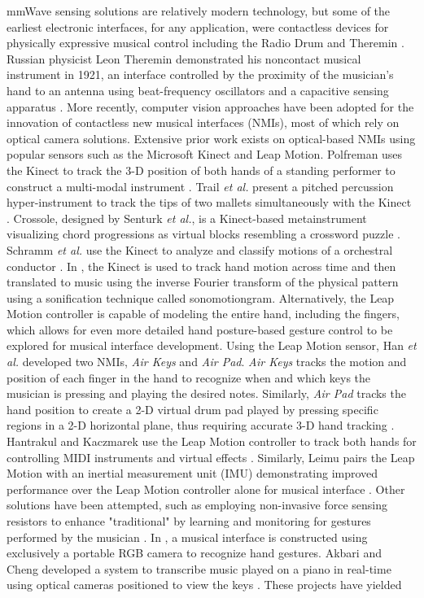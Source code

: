 \documentclass[10pt,journal,final]{IEEEtran}
\begin{document}
mmWave sensing solutions are relatively modern technology, but some of the earliest electronic interfaces, for any application, were contactless devices for physically expressive musical control including the Radio Drum and Theremin \cite{intro:theremin_and_radio_drum}. Russian physicist Leon Theremin demonstrated his noncontact musical instrument in 1921, an interface controlled by the proximity of the musician's hand to an antenna using beat-frequency oscillators and a capacitive sensing apparatus \cite{intro:phyics_of_the_theremin}. More recently, computer vision approaches have been adopted for the innovation of contactless new musical interfaces (NMIs), most of which rely on optical camera solutions. Extensive prior work exists on optical-based NMIs using popular sensors such as the Microsoft Kinect and Leap Motion. Polfreman uses the Kinect to track the 3-D position of both hands of a standing performer to construct a multi-modal instrument \cite{polfreman2011multi}. Trail \textit{et al.} present a pitched percussion hyper-instrument to track the tips of two mallets simultaneously with the Kinect \cite{trail2012non}. Crossole, designed by Senturk \textit{et al.}, is a Kinect-based metainstrument visualizing chord progressions as virtual blocks resembling a crossword puzzle \cite{senturk2012crossole}. Schramm \textit{et al.} use the Kinect to analyze and classify motions of a orchestral conductor \cite{optical_tracking:rgbd}. In \cite{jensenius2013kinectofon}, the Kinect is used to track hand motion across time and then translated to music using the inverse Fourier transform of the physical pattern using a sonification technique called sonomotiongram. Alternatively, the Leap Motion controller is capable of modeling the entire hand, including the fingers, which allows for even more detailed hand posture-based gesture control to be explored for musical interface development. Using the Leap Motion sensor, Han \textit{et al.} developed two NMIs, \textit{Air Keys} and \textit{Air Pad}. \textit{Air Keys} tracks the motion and position of each finger in the hand to recognize when and which keys the musician is pressing and playing the desired notes. Similarly, \textit{Air Pad} tracks the hand position to create a 2-D virtual drum pad played by pressing specific regions in a 2-D horizontal plane, thus requiring accurate 3-D hand tracking \cite{han2014lessons}. Hantrakul and Kaczmarek use the Leap Motion controller to track both hands for controlling MIDI instruments and virtual effects \cite{hantrakul2014implementations}. Similarly, Leimu pairs the Leap Motion with an inertial measurement unit (IMU) demonstrating improved performance over the Leap Motion controller alone for musical interface \cite{brown2016leimu}. Other solutions have been attempted, such as employing non-invasive force sensing resistors to enhance "traditional" by learning and monitoring for gestures performed by the musician \cite{ieeetm:training_surrogate_sensors}. In \cite{intro:RGBcamera}, a musical interface is constructed using exclusively a portable RGB camera to recognize hand gestures. Akbari and Cheng developed a system to transcribe music played on a piano in real-time using optical cameras positioned to view the keys \cite{ieeetm:real_time_piano_music_transcription}. These projects have yielded 
\end{document}
